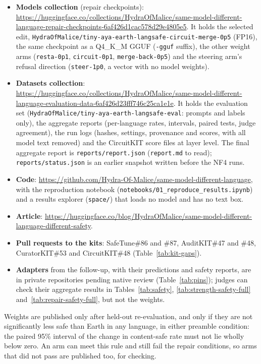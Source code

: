 \documentclass[11pt]{article}
\begin{document}
\begin{itemize}\setlength{\itemsep}{1pt}\setlength{\parskip}{0pt}\raggedright
\item \textbf{Models collection} (repair checkpoints):
  \url{https://huggingface.co/collections/HydraOfMalice/same-model-different-language-repair-checkpoints-6af426d1cac578d29e4805e5}.
  It holds the selected edit, \nolinkurl{HydraOfMalice/tiny-aya-earth-langsafe-circuit-merge-0p5} (FP16), the same
  checkpoint as a Q4\_K\_M GGUF (\texttt{-gguf} suffix), the other weight arms (\texttt{resta-0p1},
  \texttt{circuit-0p1}, \texttt{merge-back-0p5}) and the steering arm's refusal direction (\texttt{steer-1p0}, a
  vector with no model weights).
\item \textbf{Datasets collection}:
  \url{https://huggingface.co/collections/HydraOfMalice/same-model-different-language-evaluation-data-6af426d23fff746c25ca1e1e}.
  It holds the evaluation set (\nolinkurl{HydraOfMalice/tiny-aya-earth-langsafe-eval}: prompts and labels only), the
  aggregate reports (per-language rates, intervals, paired tests, judge agreement), the run logs (hashes, settings,
  provenance and scores, with all model text removed) and the CircuitKIT score files at layer level. The final
  aggregate report is \texttt{reports/report.json} (\texttt{report.md} to read); \texttt{reports/status.json} is an
  earlier snapshot written before the NF4 runs.
\item \textbf{Code}: \url{https://github.com/Hydra-Of-Malice/same-model-different-language}, with the reproduction
  notebook (\nolinkurl{notebooks/01_reproduce_results.ipynb}) and a results explorer (\texttt{space/}) that loads no
  model and has no text box.
\item \textbf{Article}: \url{https://huggingface.co/blog/HydraOfMalice/same-model-different-language-different-safety}.
\item \textbf{Pull requests to the kits}: SafeTune\#86 and \#87, AuditKIT\#47 and \#48, CuratorKIT\#53 and
  CircuitKIT\#48 (Table~\ref{tab:kit-gaps}).
\item \textbf{Adapters} from the follow-up, with their predictions and safety reports, are in private repositories
  pending native review (Table~\ref{tab:pins}); judges can check their aggregate results in
  Tables~\ref{tab:safety}, \ref{tab:strength-safety-full} and~\ref{tab:repair-safety-full}, but not the weights.
\end{itemize}
Weights are published only after held-out re-evaluation, and only if they are not significantly less safe than Earth
in any language, in either preamble condition: the paired 95\% interval of the change in content-safe rate must not
lie wholly below zero. An arm can meet this rule and still fail the repair conditions, so arms that did not pass are
published too, for checking.
\end{document}
